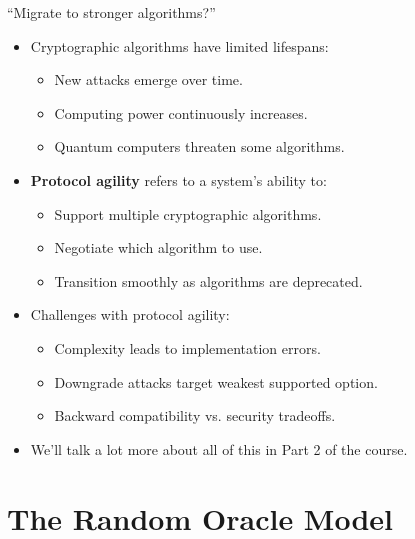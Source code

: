 \documentclass[aspectratio=169, lualatex, handout]{beamer}
\begin{document}
\begin{frame}{``Migrate to stronger algorithms?''}
	\begin{itemize}
		\item Cryptographic algorithms have limited lifespans:
		      \begin{itemize}
			      \item New attacks emerge over time.
			      \item Computing power continuously increases.
			      \item Quantum computers threaten some algorithms.
		      \end{itemize}
		\item \textbf{Protocol agility} refers to a system's ability to:
		      \begin{itemize}
			      \item Support multiple cryptographic algorithms.
			      \item Negotiate which algorithm to use.
			      \item Transition smoothly as algorithms are deprecated.
		      \end{itemize}
		\item Challenges with protocol agility:
		      \begin{itemize}
			      \item Complexity leads to implementation errors.
			      \item Downgrade attacks target weakest supported option.
			      \item Backward compatibility vs. security tradeoffs.
		      \end{itemize}
		\item We'll talk a lot more about all of this in Part 2 of the course.
	\end{itemize}
\end{frame}

\section{The Random Oracle Model}
\end{document}
